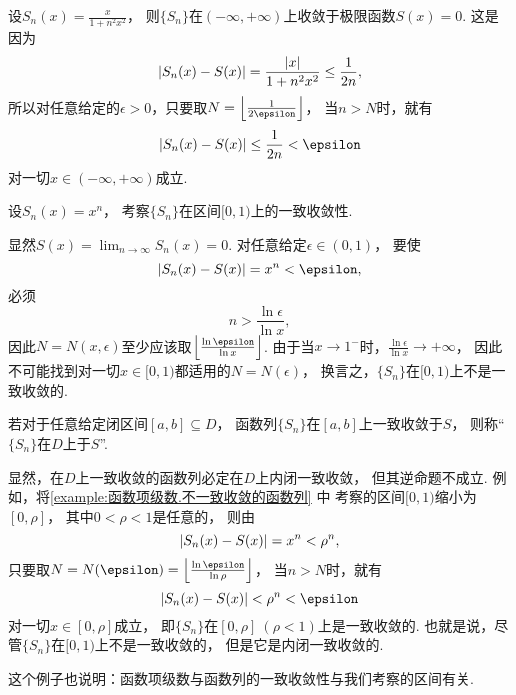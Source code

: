 \begin{example}
设\(S_n(x) = \frac{x}{1+n^2x^2}\)，
则\(\{S_n\}\)在\((-\infty,+\infty)\)上收敛于极限函数\(S(x) = 0\).
这是因为\[
	\abs{S_n(x) - S(x)}
	= \frac{\abs{x}}{1+n^2x^2}
	\leq \frac1{2n},
\]
所以对任意给定的\(\epsilon>0\)，只要取\(N = \floor*{\frac1{2\epsilon}}\)，
当\(n>N\)时，就有\[
	\abs{S_n(x) - S(x)} \leq \frac1{2n} < \epsilon
\]对一切\(x\in(-\infty,+\infty)\)成立.
\end{example}

\begin{example}\label{example:函数项级数.不一致收敛的函数列}
设\(S_n(x) = x^n\)，
考察\(\{S_n\}\)在区间\([0,1)\)上的一致收敛性.
\begin{solution}
显然\(S(x) = \lim_{n\to\infty} S_n(x) = 0\).
对任意给定\(\epsilon\in(0,1)\)，
要使\[
	\abs{S_n(x) - S(x)} = x^n < \epsilon,
\]
必须\[
	n > \frac{\ln\epsilon}{\ln x},
\]
因此\(N = N(x,\epsilon)\)至少应该取\(\floor*{\frac{\ln\epsilon}{\ln x}}\).
由于当\(x\to1^-\)时，\(\frac{\ln\epsilon}{\ln x}\to+\infty\)，
因此不可能找到对一切\(x\in[0,1)\)都适用的\(N = N(\epsilon)\)，
换言之，\(\{S_n\}\)在\([0,1)\)上不是一致收敛的.
\end{solution}
\end{example}

\begin{definition}
若对于任意给定闭区间\([a,b] \subseteq D\)，
函数列\(\{S_n\}\)在\([a,b]\)上一致收敛于\(S\)，
则称“\(\{S_n\}\)在\(D\)上于\(S\)”.
\end{definition}
显然，在\(D\)上一致收敛的函数列必定在\(D\)上内闭一致收敛，
但其逆命题不成立.
例如，将\cref{example:函数项级数.不一致收敛的函数列} 中
考察的区间\([0,1)\)缩小为\([0,\rho]\)，
其中\(0<\rho<1\)是任意的，
则由\[
	\abs{S_n(x) - S(x)} = x^n < \rho^n,
\]
只要取\(N = N(\epsilon) = \floor*{\frac{\ln\epsilon}{\ln\rho}}\)，
当\(n>N\)时，就有\[
	\abs{S_n(x) - S(x)} < \rho^n < \epsilon
\]对一切\(x\in[0,\rho]\)成立，
即\(\{S_n\}\)在\([0,\rho]\ (\rho<1)\)上是一致收敛的.
也就是说，尽管\(\{S_n\}\)在\([0,1)\)上不是一致收敛的，
但是它是内闭一致收敛的.

这个例子也说明：函数项级数与函数列的一致收敛性与我们考察的区间有关.

